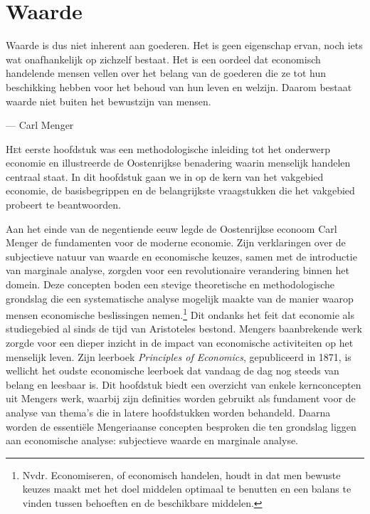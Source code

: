 \chapter{Waarde}

\begin{blockquotebox}
    Waarde is dus niet inherent aan goederen. Het is geen eigenschap ervan, noch iets wat onafhankelijk op zichzelf bestaat. Het is een oordeel dat economisch handelende mensen vellen over het belang van de goederen die ze tot hun beschikking hebben voor het behoud van hun leven en welzijn. Daarom bestaat waarde niet buiten het bewustzijn van mensen.\footnotemark
    \par\raggedleft--- Carl Menger
\end{blockquotebox}
\autocite{13}

\lettrine{H}et eerste hoofdstuk was een methodologische inleiding tot het onderwerp economie en illustreerde de Oostenrijkse benadering waarin menselijk handelen centraal staat. In dit hoofdstuk gaan we in op de kern van het vakgebied economie, de basisbegrippen en de belangrijkste vraagstukken die het vakgebied probeert te beantwoorden.

Aan het einde van de negentiende eeuw legde de Oostenrijkse econoom Carl Menger de fundamenten voor de moderne economie. Zijn verklaringen over de subjectieve natuur van waarde en economische keuzes, samen met de introductie van marginale analyse, zorgden voor een revolutionaire verandering binnen het domein. Deze concepten boden een stevige theoretische en methodologische grondslag die een systematische analyse mogelijk maakte van de manier waarop mensen economische beslissingen nemen.\footnote{Nvdr. Economiseren, of economisch handelen, houdt in dat men bewuste keuzes maakt met het doel middelen optimaal te benutten en een balans te vinden tussen behoeften en de beschikbare middelen.} Dit ondanks het feit dat economie als studiegebied al sinds de tijd van Aristoteles bestond. Mengers baanbrekende werk zorgde voor een dieper inzicht in de impact van economische activiteiten op het menselijk leven. Zijn leerboek \textit{Principles of Economics}, gepubliceerd in 1871, is wellicht het oudste economische leerboek dat vandaag de dag nog steeds van belang en leesbaar is. Dit hoofdstuk biedt een overzicht van enkele kernconcepten uit Mengers werk, waarbij zijn definities worden gebruikt als fundament voor de analyse van thema's die in latere hoofdstukken worden behandeld. Daarna worden de essentiële Mengeriaanse concepten besproken die ten grondslag liggen aan economische analyse: subjectieve waarde en marginale analyse.

